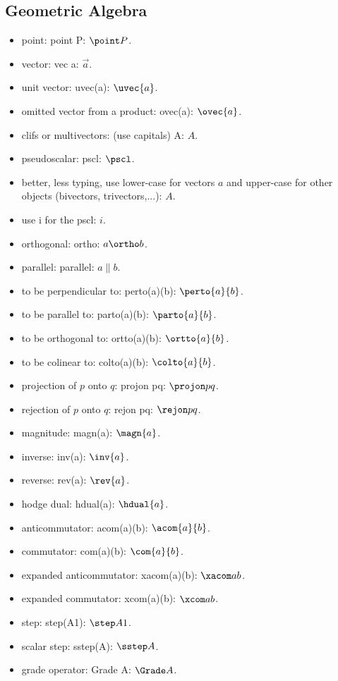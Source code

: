 \begin{multicols}{2}
\subsection{Geometric Algebra}
\begin{itemize}
\item point: point P: $\point P$.
\item vector: vec a: $\vec a$.
\item unit vector: uvec(a): $\uvec{a}$.
\item omitted vector from a product: ovec(a): $\ovec{a}$.
\item clifs or multivectors: (use capitals) A: $A$.
\item pseudoscalar: pscl: $\pscl$.
\item better, less typing, use lower-case for vectors $a$ and upper-case for other objects (bivectors, trivectors,...): $A$.
\item use i for the pscl: $i$.
\item orthogonal: ortho: $a\ortho b$.
\item parallel: parallel: $a\parallel b$.
\item to be perpendicular to: perto(a)(b): $\perto{a}{b}$.
\item to be parallel to: parto(a)(b): $\parto{a}{b}$.
\item to be orthogonal to: ortto(a)(b): $\ortto{a}{b}$.
\item to be colinear to: colto(a)(b): $\colto{a}{b}$.
\item projection of $p$ onto $q$: projon pq: $\projon pq$.
\item rejection of $p$ onto $q$: rejon pq: $\rejon pq$.
\item magnitude: magn(a): $\magn{a}$.
\item inverse: inv(a): $\inv{a}$.
\item reverse: rev(a): $\rev{a}$.
\item hodge dual: hdual(a): $\hdual{a}$.
\item anticommutator: acom(a)(b): $\acom{a}{b}$.
\item commutator: com(a)(b): $\com{a}{b}$.
\item expanded anticommutator: xacom(a)(b): $\xacom ab$.
\item expanded commutator: xcom(a)(b): $\xcom ab$.
\item step: step(A1): $\step A1$.
\item scalar step: sstep(A): $\sstep A$.
\item grade operator: Grade A: $\Grade A$.

\end{itemize}
\end{multicols}
